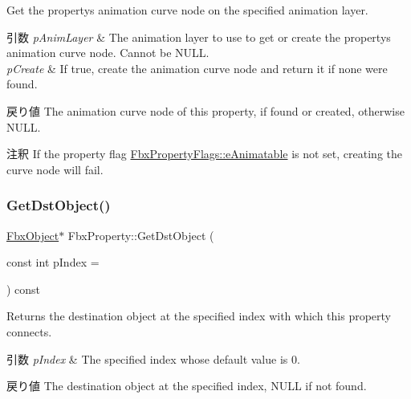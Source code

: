 Get the property\textquotesingle{}s animation curve node on the specified animation layer. 
\begin{DoxyParams}{引数}
{\em p\+Anim\+Layer} & The animation layer to use to get or create the property\textquotesingle{}s animation curve node. Cannot be N\+U\+LL. \\
\hline
{\em p\+Create} & If {\ttfamily true}, create the animation curve node and return it if none were found. \\
\hline
\end{DoxyParams}
\begin{DoxyReturn}{戻り値}
The animation curve node of this property, if found or created, otherwise N\+U\+LL. 
\end{DoxyReturn}
\begin{DoxyRemark}{注釈}
If the property flag \hyperlink{class_fbx_property_flags_afabfa7e0949aac8a7dcdf8a141867e99ae2c562a65bb942f3f94631794bc3d257}{Fbx\+Property\+Flags\+::e\+Animatable} is not set, creating the curve node will fail. 
\end{DoxyRemark}
\mbox{\label{class_fbx_property_ace9e846d1442c106958d34a1364533e4}} 
\subsubsection{\texorpdfstring{Get\+Dst\+Object()}{GetDstObject()}\hspace{0.1cm}{\footnotesize\ttfamily [1/4]}}
{\footnotesize\ttfamily \hyperlink{class_fbx_object}{Fbx\+Object}$\ast$ Fbx\+Property\+::\+Get\+Dst\+Object (\begin{DoxyParamCaption}\item[{const int}]{p\+Index = {} }\end{DoxyParamCaption}) const}

Returns the destination object at the specified index with which this property connects. 
\begin{DoxyParams}{引数}
{\em p\+Index} & The specified index whose default value is 0. \\
\hline
\end{DoxyParams}
\begin{DoxyReturn}{戻り値}
The destination object at the specified index, N\+U\+LL if not found. 
\end{DoxyReturn}
\mbox{\label{class_fbx_property_a49669c464e5caecb2cf954972e9af366}} 
